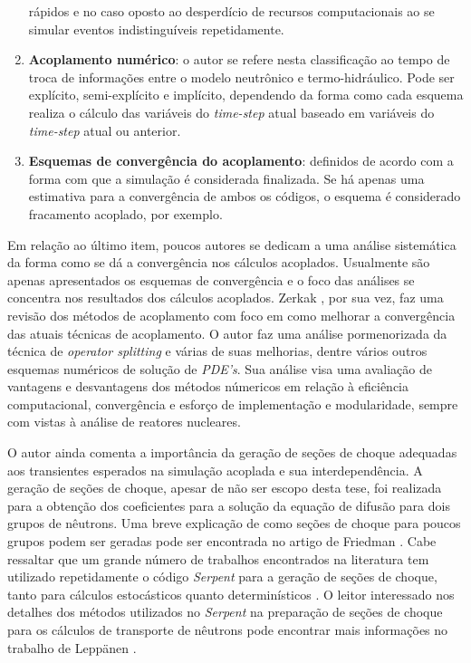 \begin{enumerate}
rápidos e no caso oposto ao desperdício de recursos computacionais ao se simular eventos indistinguíveis repetidamente.
\item \textbf{Acoplamento numérico}: o autor se refere nesta classificação ao tempo de troca de informações entre o modelo 
neutrônico e termo-hidráulico. Pode ser explícito, semi-explícito e implícito, dependendo da forma como cada esquema 
realiza o cálculo das variáveis do \textit{time-step} atual baseado em variáveis do \textit{time-step} atual ou 
anterior.
\item \textbf{Esquemas de convergência do acoplamento}: definidos de acordo com a forma com que a simulação é considerada 
finalizada. Se há apenas uma estimativa para a convergência de ambos os códigos, o esquema é considerado fracamento 
acoplado, por exemplo.  
\end{enumerate}

Em relação ao último item, poucos autores se dedicam a uma análise sistemática da forma como se
dá a convergência nos cálculos acoplados. Usualmente são apenas apresentados os esquemas
de convergência e o foco das análises se concentra nos resultados dos cálculos acoplados.
Zerkak \cite{Zerkak2015}, por sua vez, faz uma revisão dos métodos de acoplamento com
foco em como melhorar a convergência das atuais técnicas de acoplamento. O autor faz uma
análise pormenorizada da técnica de \textit{operator splitting} e várias de suas melhorias,
dentre vários outros esquemas numéricos de solução de \textit{PDE's}. Sua análise visa
uma avaliação de vantagens e desvantagens dos métodos númericos em relação à eficiência
computacional, convergência e esforço de implementação e modularidade, sempre com vistas
à análise de reatores nucleares.

O autor ainda comenta a importância da geração de seções de choque adequadas aos transientes esperados na 
simulação acoplada e sua interdependência. A geração de seções de choque, apesar de não ser escopo desta tese,
foi realizada para a obtenção dos coeficientes para a solução da equação de difusão para dois grupos de nêutrons.
Uma breve explicação de como seções de choque para poucos grupos podem ser geradas pode ser encontrada no
artigo de Friedman \cite{Friedman2013}. Cabe ressaltar que um grande número de trabalhos encontrados
na literatura tem utilizado repetidamente o código \textit{Serpent} \cite{Serpent2013} para
a geração de seções de choque, tanto para cálculos estocásticos quanto determinísticos \cite{Jareteg2014}. O leitor interessado nos detalhes dos métodos utilizados no \textit{Serpent} na
preparação de seções de choque para os cálculos de transporte de nêutrons pode encontrar mais informações no trabalho de Leppänen \cite{Leppanen2009}.

